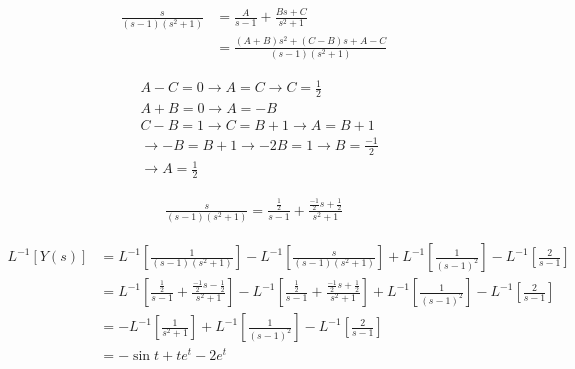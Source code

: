 \documentclass[12pt]{book}
\begin{document}
\begin{align*}
\frac{s}{(s-1)(s^{2}+1)}  &= \frac{A}{s-1} + \frac{Bs + C}{s^{2} + 1} \\
&= \frac{(A+B)s^{2} + (C-B)s + A - C}{(s-1)(s^{2}+1)}
\end{align*}


\begin{align*}
&A - C = 0 \to A = C \to C = \frac{1}{2} \\
&A + B = 0 \to A = - B \\
&C - B = 1 \to C = B + 1 \to A = B + 1 \\
&\to -B = B + 1 \to -2 B = 1 \to B = \frac{-1}{2} \\
&\to A = \frac{1}{2}
\end{align*}



\begin{align*}
\frac{s}{(s-1)(s^{2}+1)}  = \frac{\frac{1}{2}}{s-1} + \frac{\frac{-1}{2} s + \frac{1}{2}}{s^{2} + 1}
\end{align*}

\begin{align*}
L^{-1}[Y(s)] &= L^{-1}\left[ \frac{1}{(s-1)(s^{2}+1)} \right] - L^{-1}\left[ \frac{s}{(s-1)(s^{2}+1)} \right] + L^{-1}\left[ \frac{1}{(s-1)^{2}} \right] - L^{-1}\left[ \frac{2}{s-1} \right] \\
&= L^{-1}\left[ \frac{\frac{1}{2}}{s-1} + \frac{\frac{-1}{2} s - \frac{1}{2}}{s^{2} + 1}  \right] - L^{-1}\left[ \frac{\frac{1}{2}}{s-1} + \frac{\frac{-1}{2} s + \frac{1}{2}}{s^{2} + 1} \right] + L^{-1}\left[ \frac{1}{(s-1)^{2}} \right] - L^{-1}\left[ \frac{2}{s-1} \right] \\
&= - L^{-1}\left[ \frac{1}{s^{2}+1} \right] + L^{-1}\left[ \frac{1}{(s-1)^{2}} \right] - L^{-1}\left[ \frac{2}{s-1} \right] \\
&= - \sin{t} + te^{t} - 2e^{t}
\end{align*}
\end{document}
